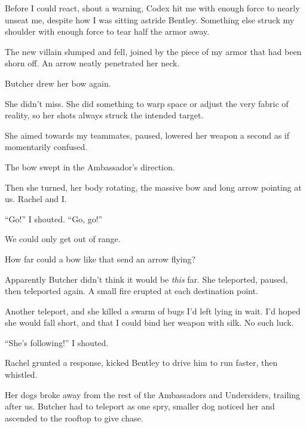 Before I could react, shout a warning, Codex hit me with enough force to nearly unseat me, despite how I was sitting astride Bentley.  Something else struck my shoulder with enough force to tear half the armor away.



The new villain slumped and fell, joined by the piece of my armor that had been shorn off.  An arrow neatly penetrated her neck.



Butcher drew her bow again.



She didn't miss.  She did something to warp space or adjust the very fabric of reality, so her shots always struck the intended target.



She aimed towards my teammates, paused, lowered her weapon a second as if momentarily confused.



The bow swept in the Ambassador's direction.



Then she turned, her body rotating, the massive bow and long arrow pointing at us.  Rachel and I.



``Go!'' I shouted.  ``Go, go!''



We could only get out of range.



How far could a bow like that send an arrow flying?



Apparently Butcher didn't think it would be \emph{this} far.  She teleported, paused, then teleported again.  A small fire erupted at each destination point.



Another teleport, and she killed a swarm of bugs I'd left lying in wait.  I'd hoped she would fall short, and that I could bind her weapon with silk.  No such luck.



``She's following!'' I shouted.



Rachel grunted a response, kicked Bentley to drive him to run faster, then whistled.



Her dogs broke away from the rest of the Ambassadors and Undersiders, trailing after us.  Butcher had to teleport as one spry, smaller dog noticed her and ascended to the rooftop to give chase.



